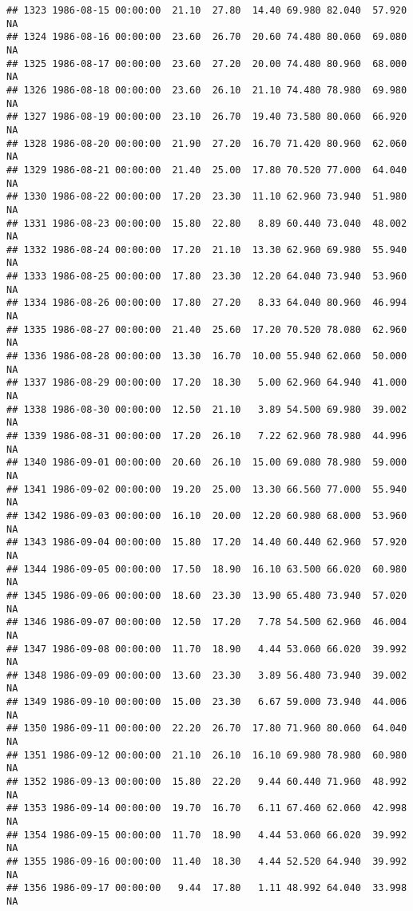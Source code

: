 \documentclass{article}\usepackage{graphicx, color}
\makeatletter
\newenvironment{kframe}{%
 \def\at@end@of@kframe{}%
 \ifinner\ifhmode%
  \def\at@end@of@kframe{\end{minipage}}%
  \begin{minipage}{\columnwidth}%
 \fi\fi%
 \def\FrameCommand##1{\hskip\@totalleftmargin \hskip-\fboxsep
 \colorbox{shadecolor}{##1}\hskip-\fboxsep
     \hskip-\linewidth \hskip-\@totalleftmargin \hskip\columnwidth}%
 \MakeFramed {\advance\hsize-\width
   \@totalleftmargin\z@ \linewidth\hsize
   \@setminipage}}%
 {\par\unskip\endMakeFramed%
 \at@end@of@kframe}
\newenvironment{knitrout}{}{} %
\makeatother
\begin{document}
\begin{knitrout}
\begin{kframe}
\begin{verbatim}
## 1323 1986-08-15 00:00:00  21.10  27.80  14.40 69.980 82.040  57.920     NA
## 1324 1986-08-16 00:00:00  23.60  26.70  20.60 74.480 80.060  69.080     NA
## 1325 1986-08-17 00:00:00  23.60  27.20  20.00 74.480 80.960  68.000     NA
## 1326 1986-08-18 00:00:00  23.60  26.10  21.10 74.480 78.980  69.980     NA
## 1327 1986-08-19 00:00:00  23.10  26.70  19.40 73.580 80.060  66.920     NA
## 1328 1986-08-20 00:00:00  21.90  27.20  16.70 71.420 80.960  62.060     NA
## 1329 1986-08-21 00:00:00  21.40  25.00  17.80 70.520 77.000  64.040     NA
## 1330 1986-08-22 00:00:00  17.20  23.30  11.10 62.960 73.940  51.980     NA
## 1331 1986-08-23 00:00:00  15.80  22.80   8.89 60.440 73.040  48.002     NA
## 1332 1986-08-24 00:00:00  17.20  21.10  13.30 62.960 69.980  55.940     NA
## 1333 1986-08-25 00:00:00  17.80  23.30  12.20 64.040 73.940  53.960     NA
## 1334 1986-08-26 00:00:00  17.80  27.20   8.33 64.040 80.960  46.994     NA
## 1335 1986-08-27 00:00:00  21.40  25.60  17.20 70.520 78.080  62.960     NA
## 1336 1986-08-28 00:00:00  13.30  16.70  10.00 55.940 62.060  50.000     NA
## 1337 1986-08-29 00:00:00  17.20  18.30   5.00 62.960 64.940  41.000     NA
## 1338 1986-08-30 00:00:00  12.50  21.10   3.89 54.500 69.980  39.002     NA
## 1339 1986-08-31 00:00:00  17.20  26.10   7.22 62.960 78.980  44.996     NA
## 1340 1986-09-01 00:00:00  20.60  26.10  15.00 69.080 78.980  59.000     NA
## 1341 1986-09-02 00:00:00  19.20  25.00  13.30 66.560 77.000  55.940     NA
## 1342 1986-09-03 00:00:00  16.10  20.00  12.20 60.980 68.000  53.960     NA
## 1343 1986-09-04 00:00:00  15.80  17.20  14.40 60.440 62.960  57.920     NA
## 1344 1986-09-05 00:00:00  17.50  18.90  16.10 63.500 66.020  60.980     NA
## 1345 1986-09-06 00:00:00  18.60  23.30  13.90 65.480 73.940  57.020     NA
## 1346 1986-09-07 00:00:00  12.50  17.20   7.78 54.500 62.960  46.004     NA
## 1347 1986-09-08 00:00:00  11.70  18.90   4.44 53.060 66.020  39.992     NA
## 1348 1986-09-09 00:00:00  13.60  23.30   3.89 56.480 73.940  39.002     NA
## 1349 1986-09-10 00:00:00  15.00  23.30   6.67 59.000 73.940  44.006     NA
## 1350 1986-09-11 00:00:00  22.20  26.70  17.80 71.960 80.060  64.040     NA
## 1351 1986-09-12 00:00:00  21.10  26.10  16.10 69.980 78.980  60.980     NA
## 1352 1986-09-13 00:00:00  15.80  22.20   9.44 60.440 71.960  48.992     NA
## 1353 1986-09-14 00:00:00  19.70  16.70   6.11 67.460 62.060  42.998     NA
## 1354 1986-09-15 00:00:00  11.70  18.90   4.44 53.060 66.020  39.992     NA
## 1355 1986-09-16 00:00:00  11.40  18.30   4.44 52.520 64.940  39.992     NA
## 1356 1986-09-17 00:00:00   9.44  17.80   1.11 48.992 64.040  33.998     NA

\end{verbatim}
\end{kframe}
\end{knitrout}
\end{document}
